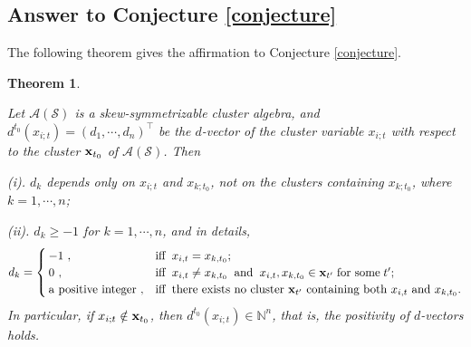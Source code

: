 \documentclass[14pt]{amsart}
\newtheorem{Theorem}{Theorem}[section]
\begin{document}
\subsection{Answer to Conjecture \ref{conjecture}}

The following theorem gives the affirmation to Conjecture \ref{conjecture}.

\begin{Theorem}\label{thmanswer}

Let  $\mathcal A(\mathcal S)$ is a skew-symmetrizable cluster algebra, and $d^{t_0}(x_{i;t}) = (d_1,\cdots,d_n)^{\top}$ be the $d$-vector of the cluster variable $x_{i;t}$ with respect to the cluster ${\bf x}_{t_0}$ of $\mathcal A(\mathcal S)$. Then


(i).  $d_k$ depends only on $x_{i;t}$ and $x_{k;t_0}$, not on the clusters containing $x_{k;t_0}$, where $k=1,\cdots,n$;

(ii).  $d_k\geq -1$ for $k=1,\cdots,n$, and in details,
\begin{eqnarray}
d_k=\begin{cases} -1~,& \text{iff}\;\; x_{i,t}=x_{k,t_0};\\ 0~,& \text{iff}\;\;x_{i,t}\not=x_{k,t_0}\;\;\text{and}\;\; x_{i,t}, x_{k,t_0}\in {\bf x}_{t^\prime} \; \text{for some}\; t^\prime;\\ \text{a positive integer}~, & \text{iff}\;\; \text{there exists no cluster } {\bf x}_{t^\prime} \text{ containing both }x_{i,t} \text{ and }x_{k,t_0} .\end{cases}\nonumber
\end{eqnarray}
In particular, if $x_{i;t}\notin{\bf x}_{t_0}$, then $d^{t_0}(x_{i;t})\in\mathbb N^n$, that is, the positivity of $d$-vectors holds.


\end{Theorem}
\end{document}
